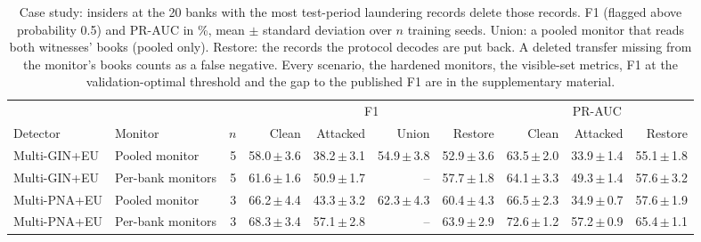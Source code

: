 \begin{table}[!htbp]\centering\small\setlength{\tabcolsep}{4pt}
\caption{Case study: insiders at the 20 banks with the most test-period laundering records delete those records. F1 (flagged above probability 0.5) and PR-AUC in \%, mean $\pm$ standard deviation over $n$ training seeds. Union: a pooled monitor that reads both witnesses' books (pooled only). Restore: the records the protocol decodes are put back. A deleted transfer missing from the monitor's books counts as a false negative. Every scenario, the hardened monitors, the visible-set metrics, F1 at the validation-optimal threshold and the gap to the published F1 are in the supplementary material.}\label{tab:amlcase}
\begin{adjustbox}{max width=\linewidth}\begin{tabular}{llrrrrrrrr}\toprule
 & & & \multicolumn{4}{c}{F1} & \multicolumn{3}{c}{PR-AUC} \\\cmidrule(lr){4-7}\cmidrule(lr){8-10}
Detector & Monitor & $n$ & Clean & Attacked & Union & Restore & Clean & Attacked & Restore \\\midrule
Multi-GIN+EU & Pooled monitor & 5 & 58.0\,$\pm$\,3.6 & 38.2\,$\pm$\,3.1 & 54.9\,$\pm$\,3.8 & 52.9\,$\pm$\,3.6 & 63.5\,$\pm$\,2.0 & 33.9\,$\pm$\,1.4 & 55.1\,$\pm$\,1.8 \\
Multi-GIN+EU & Per-bank monitors & 5 & 61.6\,$\pm$\,1.6 & 50.9\,$\pm$\,1.7 & -- & 57.7\,$\pm$\,1.8 & 64.1\,$\pm$\,3.3 & 49.3\,$\pm$\,1.4 & 57.6\,$\pm$\,3.2 \\
Multi-PNA+EU & Pooled monitor & 3 & 66.2\,$\pm$\,4.4 & 43.3\,$\pm$\,3.2 & 62.3\,$\pm$\,4.3 & 60.4\,$\pm$\,4.3 & 66.5\,$\pm$\,2.3 & 34.9\,$\pm$\,0.7 & 57.6\,$\pm$\,1.9 \\
Multi-PNA+EU & Per-bank monitors & 3 & 68.3\,$\pm$\,3.4 & 57.1\,$\pm$\,2.8 & -- & 63.9\,$\pm$\,2.9 & 72.6\,$\pm$\,1.2 & 57.2\,$\pm$\,0.9 & 65.4\,$\pm$\,1.1 \\
\bottomrule\end{tabular}\end{adjustbox}\end{table}